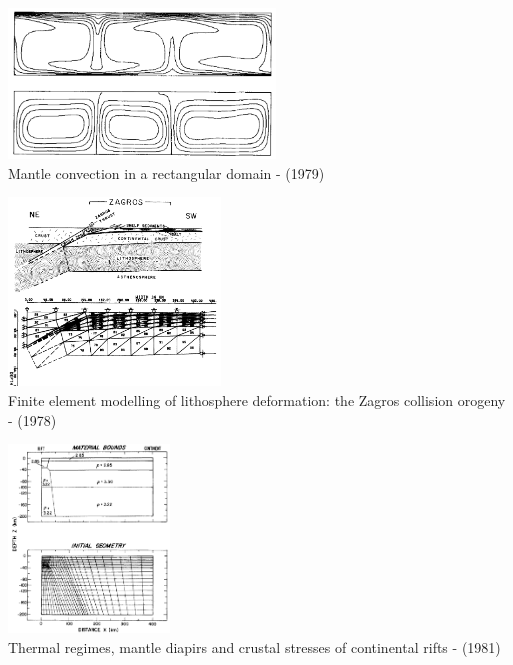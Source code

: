\begin{center}
\includegraphics[height=4cm]{images/history/ludt79}\\
{\captionfont Mantle convection in a rectangular domain - \textcite{ludt79} (1979)}
\end{center}


\begin{center}
\begin{minipage}{0.45\textwidth}
\centering
\includegraphics[height=5cm]{images/history/bird78b}\\
{\captionfont Finite element modelling of lithosphere deformation: the Zagros collision 
orogeny - \textcite{bird78b} (1978)}
\end{minipage}\hfill
\begin{minipage}{0.45\textwidth}
\centering
\includegraphics[height=5cm]{images/history/brpo81}\\
{\captionfont Thermal regimes, mantle diapirs and crustal stresses of 
continental rifts - \textcite{brpo81} (1981)}
\end{minipage}
\end{center}

